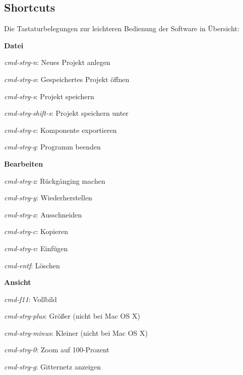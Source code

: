 \documentclass[12pt,a4paper]{scrartcl}
\begin{document}
\subsection{Shortcuts}
Die Tastaturbelegungen zur leichteren Bedienung der Software in Übersicht:
\begin{enum}
	\item \textbf{Datei}
		\begin{enum}
			\item \textit{\gls{cmd-strg-n}}: Neues Projekt anlegen
			\item \textit{\gls{cmd-strg-o}}: Gespeichertes Projekt öffnen
			\item \textit{\gls{cmd-strg-s}}: Projekt speichern
			\item \textit{\gls{cmd-strg-shift-s}}: Projekt speichern unter
			\item \textit{\gls{cmd-strg-e}}: Komponente exportieren
			\item \textit{\gls{cmd-strg-q}}: Programm beenden
		\end{enum}
\end{enum}
\begin{enum}
	\item \textbf{Bearbeiten}
		\begin{enum}
			\item \textit{\gls{cmd-strg-z}}: Rückgänging machen
			\item \textit{\gls{cmd-strg-y}}: Wiederherstellen
			\item \textit{\gls{cmd-strg-x}}: Ausschneiden
			\item \textit{\gls{cmd-strg-c}}: Kopieren
			\item \textit{\gls{cmd-strg-v}}: Einfügen
			\item \textit{\gls{cmd-entf}}: Löschen
		\end{enum}
\end{enum}
\begin{enum}
	\item \textbf{Ansicht}
		\begin{enum}
			\item \textit{\gls{cmd-f11}}: Vollbild
			\item \textit{\gls{cmd-strg-plus}}: Größer (nicht bei Mac OS X)
			\item \textit{\gls{cmd-strg-minus}}: Kleiner (nicht bei Mac OS X)
			\item \textit{\gls{cmd-strg-0}}: Zoom auf 100-Prozent
			\item \textit{\gls{cmd-strg-g}}: Gitternetz anzeigen
		\end{enum}
\end{enum}
\end{document}
